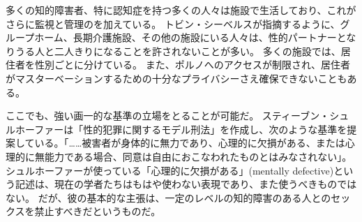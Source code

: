 \documentclass[paper=a4,book,openany]{jlreq}
\begin{document}
多くの知的障害者、特に認知症を持つ多くの人々は施設で生活しており、これがさらに監視と管理のを加えている。
トビン・シーベルスが指摘するように、グループホーム、長期介護施設、その他の施設にいる人々は、性的パートナーとなりうる人と二人きりになることを許されないことが多い。
多くの施設では、居住者を性別ごとに分けている。
また、ポルノへのアクセスが制限され、居住者がマスターベーションするための十分なプライバシーさえ確保できないこともある\citep[p.45]{siebers12:_sexual_cultur_disab_peopl}。

ここでも、強い画一的な基準の立場をとることが可能だ。
スティーブン・シュルホーファーは「性的犯罪に関するモデル刑法」を作成し、次のような基準を提案している。「……被害者が身体的に無力であり、心理的に欠損がある、または心理的に無能力である場合、同意は自由におこなわれたものとはみなされない」\citep[p.283]{schulhofer98:_unwan_sex}。
シュルホーファーが使っている「心理的に欠損がある」(mentally defective)という記述は、現在の学者たちはもはや使わない表現であり、また使うべきものではない。
だが、彼の基本的な主張は、一定のレベルの知的障害のある人とのセックスを禁止すべきだというものだ。
\end{document}
